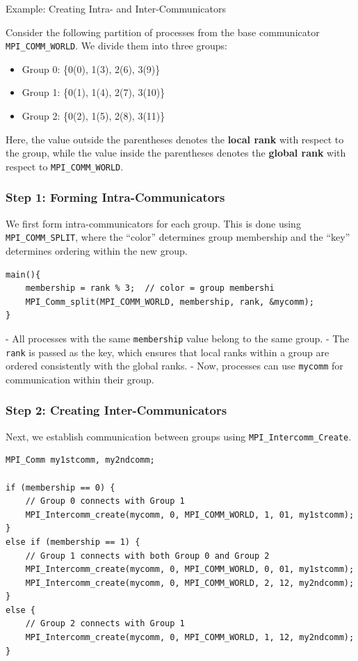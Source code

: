 \documentclass[12pt]{book}
\begin{document}
\begin{example}
Example: Creating Intra- and Inter-Communicators

Consider the following partition of processes from the base communicator \texttt{MPI\_COMM\_WORLD}.  
We divide them into three groups:

\begin{itemize}
    \item Group 0: \{0(0), 1(3), 2(6), 3(9)\}
    \item Group 1: \{0(1), 1(4), 2(7), 3(10)\}
    \item Group 2: \{0(2), 1(5), 2(8), 3(11)\}
\end{itemize}

Here, the value outside the parentheses denotes the \textbf{local rank} with respect to the group, while the value inside the parentheses denotes the \textbf{global rank} with respect to \texttt{MPI\_COMM\_WORLD}.

\subsubsection{Step 1: Forming Intra-Communicators}
We first form intra-communicators for each group. This is done using \texttt{MPI\_COMM\_SPLIT}, where the ``color'' determines group membership and the ``key'' determines ordering within the new group.

\begin{lstlisting}[style=cppstyle]
main(){
    membership = rank % 3;  // color = group membershi
    MPI_Comm_split(MPI_COMM_WORLD, membership, rank, &mycomm);
}
\end{lstlisting}

- All processes with the same \texttt{membership} value belong to the same group.  
- The \texttt{rank} is passed as the key, which ensures that local ranks within a group are ordered consistently with the global ranks.  
- Now, processes can use \texttt{mycomm} for communication within their group.


\subsubsection{Step 2: Creating Inter-Communicators}
Next, we establish communication between groups using \texttt{MPI\_Intercomm\_Create}.  

\begin{lstlisting}[style=cppstyle]
MPI_Comm my1stcomm, my2ndcomm;

if (membership == 0) {
    // Group 0 connects with Group 1
    MPI_Intercomm_create(mycomm, 0, MPI_COMM_WORLD, 1, 01, my1stcomm);
}
else if (membership == 1) {
    // Group 1 connects with both Group 0 and Group 2
    MPI_Intercomm_create(mycomm, 0, MPI_COMM_WORLD, 0, 01, my1stcomm);
    MPI_Intercomm_create(mycomm, 0, MPI_COMM_WORLD, 2, 12, my2ndcomm);
}
else {
    // Group 2 connects with Group 1
    MPI_Intercomm_create(mycomm, 0, MPI_COMM_WORLD, 1, 12, my2ndcomm);
}
\end{lstlisting}


\end{example}
\end{document}
